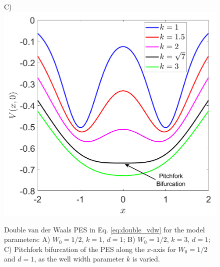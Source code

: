 \documentclass[10pt,aps,onecolumn,superscriptaddress]{revtex4-2}
\begin{document}
\begin{figure}[htbp]
	C)\includegraphics[scale=0.25]{pitcforkBif.png}
	\caption{Double van der Waals PES in Eq. \eqref{eq:double_vdw} for the model parameters: A) $W_0 = 1/2$, $k = 1$, $d = 1$; B) $W_0 = 1/2$, $k = 3$, $d = 1$; C) Pitchfork bifurcation of the PES along the $x$-axis for $W_0 = 1/2$ and $d = 1$, as the well width parameter $k$ is varied.}
	\label{fig:double_vdw_PES}
\end{figure}


\end{document}
